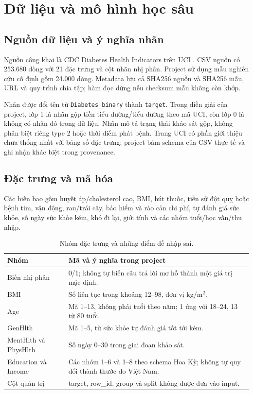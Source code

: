 \chapter{Dữ liệu và mô hình học sâu}
\section{Nguồn dữ liệu và ý nghĩa nhãn}
Nguồn công khai là CDC Diabetes Health Indicators trên UCI \cite{uci}. CSV nguồn có 253.680 dòng với 21 đặc trưng và cột nhãn nhị phân. Project sử dụng mẫu nghiên cứu cố định gồm 24.000 dòng. Metadata lưu cả SHA256 nguồn và SHA256 mẫu, URL và quy trình chia tập; hàm đọc dừng nếu checksum mẫu không còn khớp.

Nhãn được đổi tên từ \texttt{Diabetes\_binary} thành \texttt{target}. Trong diễn giải của project, lớp 1 là nhãn gộp tiền tiểu đường/tiểu đường theo mã UCI, còn lớp 0 là không có nhãn đó trong dữ liệu. Nhãn mô tả trạng thái khảo sát gộp, không phân biệt riêng type 2 hoặc thời điểm phát bệnh. Trang UCI có phần giới thiệu chưa thống nhất với bảng số đặc trưng; project bám schema của CSV thực tế và ghi nhận khác biệt trong provenance.

\section{Đặc trưng và mã hóa}
Các biến bao gồm huyết áp/cholesterol cao, BMI, hút thuốc, tiền sử đột quỵ hoặc bệnh tim, vận động, rau/trái cây, bảo hiểm và rào cản chi phí, tự đánh giá sức khỏe, số ngày sức khỏe kém, khó đi lại, giới tính và các nhóm tuổi/học vấn/thu nhập.

\begin{table}[H]\centering\small
\caption{Nhóm đặc trưng và những điểm dễ nhập sai.}
\begin{tabularx}{\textwidth}{@{}p{4cm}Y@{}}\toprule
Nhóm & Mã và ý nghĩa trong project \\\midrule
Biến nhị phân & 0/1; không tự biến câu trả lời mơ hồ thành một giá trị mặc định. \\
BMI & Số liên tục trong khoảng 12--98, đơn vị kg/m$^2$. \\
Age & Mã 1--13, không phải tuổi theo năm; 1 ứng với 18--24, 13 từ 80 tuổi. \\
GenHlth & Mã 1--5, từ sức khỏe tự đánh giá tốt tới kém. \\
MentHlth và PhysHlth & Số ngày 0--30 trong giai đoạn khảo sát. \\
Education và Income & Các nhóm 1--6 và 1--8 theo schema Hoa Kỳ; không tự quy đổi thành thước đo Việt Nam. \\
Cột quản trị & target, row\_id, group và split không được đưa vào input. \\\bottomrule
\end{tabularx}
\end{table}

